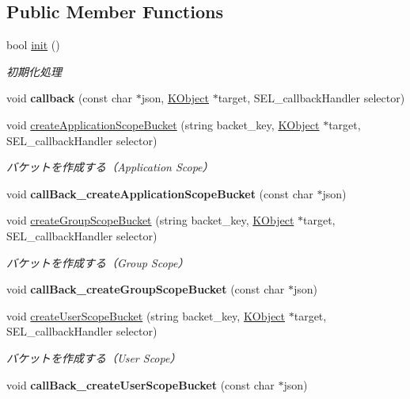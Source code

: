 \subsection*{Public Member Functions}
\begin{DoxyCompactItemize}
\item 
bool \hyperlink{class_c_kii_bucket_ae687c3b2a7e95b6e425303c9d944d35b}{init} ()
\begin{DoxyCompactList}\small\item\em 初期化処理 \end{DoxyCompactList}\item 
\hypertarget{class_c_kii_bucket_a63a646fde8ce92f4ba9bc0f1d4b1579c}{void {\bfseries callback} (const char $\ast$json, \hyperlink{class_k_object}{K\-Object} $\ast$target, S\-E\-L\-\_\-callback\-Handler selector)}\label{class_c_kii_bucket_a63a646fde8ce92f4ba9bc0f1d4b1579c}

\item 
void \hyperlink{class_c_kii_bucket_ab469cdd29a09d88b656e04f558a6f5ad}{create\-Application\-Scope\-Bucket} (string backet\-\_\-key, \hyperlink{class_k_object}{K\-Object} $\ast$target, S\-E\-L\-\_\-callback\-Handler selector)
\begin{DoxyCompactList}\small\item\em バケットを作成する（\-Application Scope） \end{DoxyCompactList}\item 
\hypertarget{class_c_kii_bucket_a260a88c89b192ba5cf2c64b5a99d7dac}{void {\bfseries call\-Back\-\_\-create\-Application\-Scope\-Bucket} (const char $\ast$json)}\label{class_c_kii_bucket_a260a88c89b192ba5cf2c64b5a99d7dac}

\item 
void \hyperlink{class_c_kii_bucket_a6a4b9cbfff06eea73a11735c171398b1}{create\-Group\-Scope\-Bucket} (string backet\-\_\-key, \hyperlink{class_k_object}{K\-Object} $\ast$target, S\-E\-L\-\_\-callback\-Handler selector)
\begin{DoxyCompactList}\small\item\em バケットを作成する（\-Group Scope） \end{DoxyCompactList}\item 
\hypertarget{class_c_kii_bucket_a7838074f46d59130d0950df5a3ff4753}{void {\bfseries call\-Back\-\_\-create\-Group\-Scope\-Bucket} (const char $\ast$json)}\label{class_c_kii_bucket_a7838074f46d59130d0950df5a3ff4753}

\item 
void \hyperlink{class_c_kii_bucket_aacf69c6348937433c8582710c5d25931}{create\-User\-Scope\-Bucket} (string backet\-\_\-key, \hyperlink{class_k_object}{K\-Object} $\ast$target, S\-E\-L\-\_\-callback\-Handler selector)
\begin{DoxyCompactList}\small\item\em バケットを作成する（\-User Scope） \end{DoxyCompactList}\item 
\hypertarget{class_c_kii_bucket_a7b2b01aac65959c483b6eefd628b9ae8}{void {\bfseries call\-Back\-\_\-create\-User\-Scope\-Bucket} (const char $\ast$json)}\label{class_c_kii_bucket_a7b2b01aac65959c483b6eefd628b9ae8}


\end{DoxyCompactItemize}
